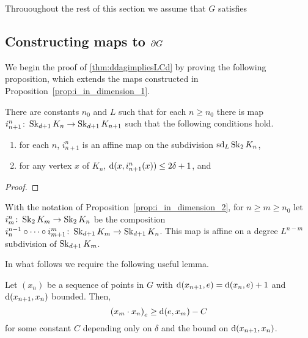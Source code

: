 \documentclass[a4paper]{article}
\begin{document}
Thrououghout the rest of this section we assume that $G$ satisfies

\subsection{Constructing maps to $\boundary G$}

We begin the proof of \cref{thm:ddagimpliesLCd} by proving the following 
proposition, which extends the maps constructed in
Proposition~\ref{prop:i_in_dimension_1}.

\begin{proposition}\label{prop:i_in_dimension_2}
  There are constants $n_0$ and $L$ such that for each $n\geq n_0$ there is map
  $i^n_{n+1}\from\Skel_{d+1} K_n \to \Skel_{d+1} K_{n+1}$ such that the
  following conditions hold.
  \begin{enumerate}
    \item for each $n$, $i^n_{n+1}$ is an affine map on the subdivision
      $\sd_L\Skel_2 K_n$,
    \item for any vertex $x$ of $K_n$, $\dist(x, i^n_{n+1}(x)) \leq 2\delta+1$,
      and
  \end{enumerate}
\end{proposition}

\begin{proof}
\end{proof}

\begin{definition}
  With the notation of Proposition~\ref{prop:i_in_dimension_2}, for $n \geq m
  \geq n_0$ let $i^n_m \from \Skel_2 K_m \to \Skel_2 K_n$ be the composition
  $i^{n-1}_n \composed \dotsb \composed i^m_{m+1} \from \Skel_{d+1} K_m \to 
  \Skel_{d+1} K_n$.  This map is affine on a degree $L^{n-m}$ subdivision of 
  $\Skel_{d+1} K_m$.
\end{definition}

In what follows we require the following useful lemma.

\begin{lemma}\label{lem:useful}
  Let $(x_n)$ be a sequence of points in $G$ with $\dist(x_{n+1}, e) = 
  \dist(x_n, e) + 1$ and $\dist(x_{n+1}, x_n)$ bounded. Then,
  \begin{equation*}
    \gromov{e}{x_m}{x_n} \geq \dist(e,x_m) - C
  \end{equation*}
  for some constant $C$ depending only on $\delta$ and the bound on 
  $\dist(x_{n+1}, x_n)$.
\end{lemma}
\end{document}
